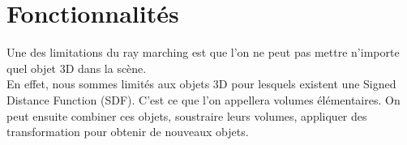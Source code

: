 \section{Fonctionnalités}
Une des limitations du ray marching est que l'on ne peut pas mettre n'importe quel objet 3D dans la scène.\\
En effet, nous sommes limités aux objets 3D pour lesquels existent une Signed Distance Function (SDF). C'est ce que l'on appellera volumes élémentaires. On peut ensuite combiner ces objets, soustraire leurs volumes, appliquer des transformation pour obtenir de nouveaux objets.


